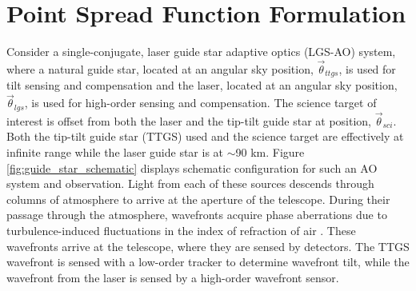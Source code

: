 \section{Point Spread Function Formulation}
\label{sec:psfform}

Consider a single-conjugate, laser guide star adaptive optics
(LGS-AO) system, where a natural guide
star, located at an angular sky position, $\vec{\theta}_{ttgs}$,
 is used for
tilt sensing and compensation and the laser, located at an angular sky position,
$\vec{\theta}_{lgs}$, is used for high-order sensing and compensation. 
The science target of interest is offset from both the laser and the
tip-tilt guide star at position, $\vec{\theta}_{sci}$.  
Both the tip-tilt guide star (TTGS) used and the science
target are effectively at infinite range while the laser guide star is
at $\sim$90 km. 
Figure \ref{fig:guide_star_schematic} displays schematic configuration for
such an AO system and observation.
Light from each of these sources descends
through columns of atmosphere to arrive at the aperture of the
telescope.  During their passage through the atmosphere, wavefronts
acquire phase aberrations due to turbulence-induced fluctuations in
the index of refraction of air \cite{Kolmogorov:1941}.
These wavefronts arrive at the telescope, where they are sensed by
detectors. The TTGS wavefront is sensed with a low-order tracker to determine wavefront
tilt, while the wavefront from the laser is sensed by a high-order 
wavefront sensor.  




